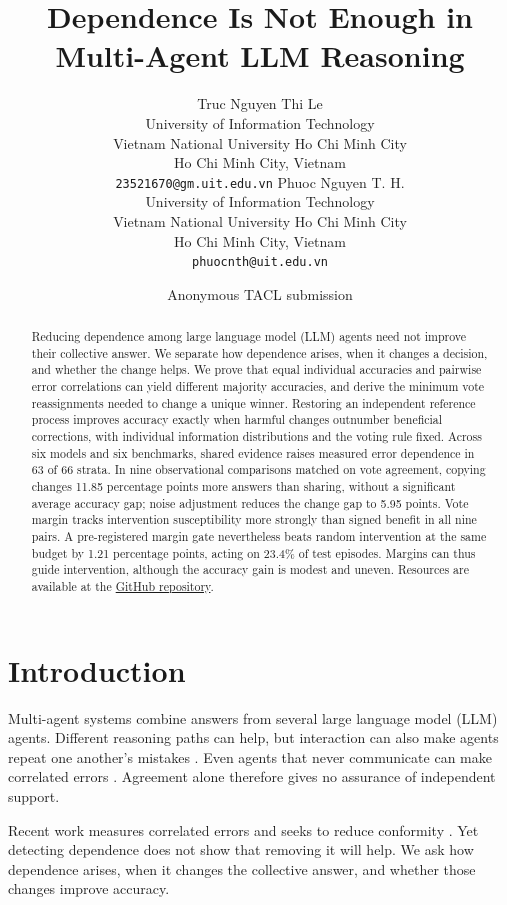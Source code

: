 \documentclass[11pt,a4paper]{article}
\title{Dependence Is Not Enough in Multi-Agent LLM Reasoning}
\author{
  Truc Nguyen Thi Le
  \\
  University of Information Technology
  \\
  Vietnam National University Ho Chi Minh City
  \\
  Ho Chi Minh City, Vietnam
  \\
  \texttt{23521670@gm.uit.edu.vn}
  \And
  Phuoc Nguyen T. H.
  \\
  University of Information Technology
  \\
  Vietnam National University Ho Chi Minh City
  \\
  Ho Chi Minh City, Vietnam
  \\
  \texttt{phuocnth@uit.edu.vn}
}
\author{Anonymous TACL submission}
\date{}
\theoremstyle{definition}
\newcommand{\resourceavailability}{Resources are available at the \href{https://github.com/Truc-05/mas-mean-field.git}{GitHub repository}.}
\newcommand{\resourceavailability}{Resources are available at the \href{https://github.com/Truc-05/mas-mean-field.git}{GitHub repository}.}
\begin{document}
\maketitle

\begin{abstract}
Reducing dependence among large language model (LLM) agents need not improve their collective answer. We separate how dependence arises, when it changes a decision, and whether the change helps. We prove that equal individual accuracies and pairwise error correlations can yield different majority accuracies, and derive the minimum vote reassignments needed to change a unique winner. Restoring an independent reference process improves accuracy exactly when harmful changes outnumber beneficial corrections, with individual information distributions and the voting rule fixed. Across six models and six benchmarks, shared evidence raises measured error dependence in 63 of 66 strata. In nine observational comparisons matched on vote agreement, copying changes 11.85 percentage points more answers than sharing, without a significant average accuracy gap; noise adjustment reduces the change gap to 5.95 points. Vote margin tracks intervention susceptibility more strongly than signed benefit in all nine pairs. A pre-registered margin gate nevertheless beats random intervention at the same budget by 1.21 percentage points, acting on 23.4\% of test episodes. Margins can thus guide intervention, although the accuracy gain is modest and uneven. \resourceavailability
\end{abstract}

\section{Introduction}
\label{sec:introduction}

Multi-agent systems combine answers from several large language model (LLM) agents. Different reasoning paths can help, but interaction can also make agents repeat one another's mistakes \citep{du-etal-2024-multiagent,zhu-etal-2026-demystifying,cui-etal-2026-free}. Even agents that never communicate can make correlated errors \citep{kim-etal-2025-correlated}. Agreement alone therefore gives no assurance of independent support.

Recent work measures correlated errors and seeks to reduce conformity \citep{kim-etal-2025-correlated,huang-etal-2026-counterfactual,cui-etal-2026-free}. Yet detecting dependence does not show that removing it will help. We ask how dependence arises, when it changes the collective answer, and whether those changes improve accuracy.
\end{document}

